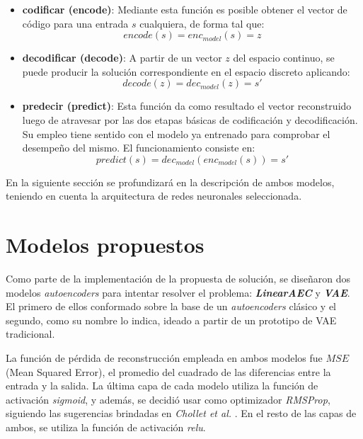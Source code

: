 \begin{itemize}
	\item \textbf{codificar (encode)}: Mediante esta función es posible obtener el vector de código para una entrada $s$ cualquiera, de forma tal que:
	\begin{equation}
		encode(s) = enc_{model}(s) = z
	\end{equation}
	\item \textbf{decodificar (decode)}: A partir de un vector $z$ del espacio continuo, se puede producir la solución correspondiente en el espacio discreto aplicando:
	\begin{equation}
	decode(z) = dec_{model}(z) = s'
	\end{equation}
	
	\item \textbf{predecir (predict)}: Esta función da como resultado el vector reconstruido luego de atravesar por las dos etapas básicas de codificación y decodificación. Su empleo tiene sentido con el modelo ya entrenado para comprobar el desempeño del mismo. El funcionamiento consiste en:
	\begin{equation}
	predict(s) = dec_{model}(enc_{model}(s)) = s'
	\end{equation}
\end{itemize}

En la siguiente sección se profundizará en la descripción de ambos modelos, teniendo en cuenta la arquitectura de redes neuronales seleccionada.


\section{Modelos propuestos}

Como parte de la implementación de la propuesta de solución, se diseñaron dos modelos \textit{autoencoders} para intentar resolver el problema: \textit{\textbf{LinearAEC}} y \textit{\textbf{VAE}}. El primero de ellos conformado sobre la base de un \textit{autoencoders} clásico y el segundo, como su nombre lo indica, ideado a partir de un prototipo de VAE tradicional.

La función de pérdida de reconstrucción empleada en ambos modelos fue $MSE$ (Mean Squared Error), el promedio del cuadrado de las diferencias entre la entrada y la salida. La última capa de cada modelo utiliza la función de activación \textit{sigmoid}, y además, se decidió usar como optimizador \textit{RMSProp}, siguiendo las sugerencias brindadas en \textit{Chollet et al.} \cite{Chollet}. En el resto de las capas de ambos, se utiliza la función de activación \textit{relu}.

